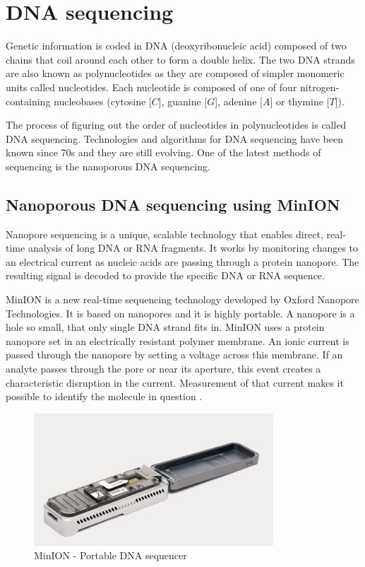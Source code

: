 \chapter{DNA sequencing}

\label{kap:dna_sequencing} %

Genetic information is coded in DNA (deoxyribonucleic acid) composed of two chains that coil around
each other to form a double helix. The two DNA strands are also known as polynucleotides as they are
composed of simpler monomeric units called nucleotides. Each nucleotide is composed of one of four
nitrogen-containing nucleobases (cytosine [$C$], guanine [$G$], adenine [$A$] or thymine [$T$]).

The process of figuring out the order of nucleotides in polynucleotides is called DNA sequencing.
Technologies and algorithms for DNA sequencing have been known since 70s and they are still
evolving. One of the latest methods of sequencing is the nanoporous DNA sequencing.

\section{Nanoporous DNA sequencing using MinION}

Nanopore sequencing is a unique, scalable technology that enables direct, real-time analysis of long
DNA or RNA fragments. It works by monitoring changes to an electrical current as nucleic acids are
passing through a protein nanopore. The resulting signal is decoded to provide the specific DNA or
RNA sequence.

MinION is a new real-time sequencing technology developed by Oxford Nanopore
Technologies. It is based on nanopores and it is highly portable. A nanopore is a hole so small,
that only single DNA strand fits in. MinION uses a protein nanopore set in an electrically resistant
polymer membrane. An ionic current is passed through the nanopore by setting a voltage across this
membrane. If an analyte passes through the pore or near its aperture, this event creates a
characteristic disruption in the current. Measurement of that current makes it possible to identify
the molecule in question \cite{first_look_minion}.

\begin{figure}[H]
  \centerline{\includegraphics[width=0.8\textwidth]{images/minion}}
  \caption[MinION]{MinION - Portable DNA sequencer}
  \label{obr:minion}
\end{figure}

